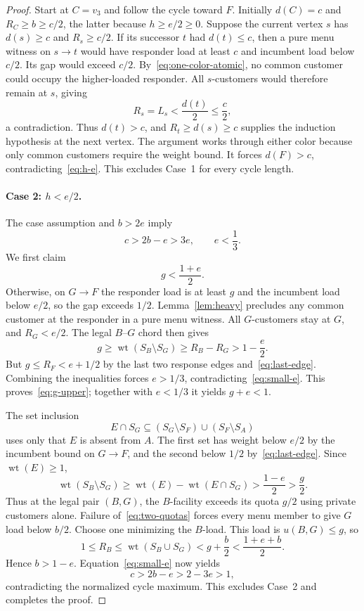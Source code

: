 \documentclass[11pt]{article}
\theoremstyle{definition}
\theoremstyle{remark}
\newcommand{\wt}{\operatorname{wt}}
\begin{document}
\begin{proof}
Start at $C=v_3$ and follow the cycle toward $F$. Initially $d(C)=c$ and $R_C\ge b\ge c/2$, the latter because $h\ge e/2\ge0$. Suppose the current vertex $s$ has $d(s)\ge c$ and $R_s\ge c/2$. If its successor $t$ had $d(t)\le c$, then a pure menu witness on $s\to t$ would have responder load at least $c$ and incumbent load below $c/2$. Its gap would exceed $c/2$. By~\eqref{eq:one-color-atomic}, no common customer could occupy the higher-loaded responder. All $s$-customers would therefore remain at $s$, giving
\[
 R_s=L_s<\frac{d(t)}2\le\frac c2,
\]
a contradiction. Thus $d(t)>c$, and $R_t\ge d(s)\ge c$ supplies the induction hypothesis at the next vertex. The argument works through either color because only common customers require the weight bound. It forces $d(F)>c$, contradicting~\eqref{eq:h-e}. This excludes Case~1 for every cycle length.

\paragraph{Case 2: $h<e/2$.}
The case assumption and $b>2e$ imply
\begin{equation}\label{eq:small-e}
 c>2b-e>3e,\qquad e<\frac13.
\end{equation}
We first claim
\begin{equation}\label{eq:g-upper}
 g<\frac{1+e}{2}.
\end{equation}
Otherwise, on $G\to F$ the responder load is at least $g$ and the incumbent load below $e/2$, so the gap exceeds $1/2$. Lemma~\ref{lem:heavy} precludes any common customer at the responder in a pure menu witness. All $G$-customers stay at $G$, and $R_G<e/2$. The legal $B$--$G$ chord then gives
\[
 g\ge\wt(S_B\setminus S_G)\ge R_B-R_G>1-\frac e2.
\]
But $g\le R_F<e+1/2$ by the last two response edges and~\eqref{eq:last-edge}. Combining the inequalities forces $e>1/3$, contradicting~\eqref{eq:small-e}. This proves~\eqref{eq:g-upper}; together with $e<1/3$ it yields $g+e<1$.

The set inclusion
\[
 E\cap S_G\subseteq(S_G\setminus S_F)\cup(S_F\setminus S_A)
\]
uses only that $E$ is absent from $A$. The first set has weight below $e/2$ by the incumbent bound on $G\to F$, and the second below $1/2$ by~\eqref{eq:last-edge}. Since $\wt(E)\ge1$,
\begin{equation}\label{eq:penultimate-private}
 \wt(S_B\setminus S_G)
 \ge\wt(E)-\wt(E\cap S_G)
 >\frac{1-e}{2}>\frac g2.
\end{equation}
Thus at the legal pair $(B,G)$, the $B$-facility exceeds its quota $g/2$ using private customers alone. Failure of~\eqref{eq:two-quotas} forces every menu member to give $G$ load below $b/2$. Choose one minimizing the $B$-load. This load is $u(B,G)\le g$, so
\[
 1\le R_B\le\wt(S_B\cup S_G)<g+\frac b2<\frac{1+e+b}{2}.
\]
Hence $b>1-e$. Equation~\eqref{eq:small-e} now yields
\[
 c>2b-e>2-3e>1,
\]
contradicting the normalized cycle maximum. This excludes Case~2 and completes the proof.
\end{proof}
\end{document}
